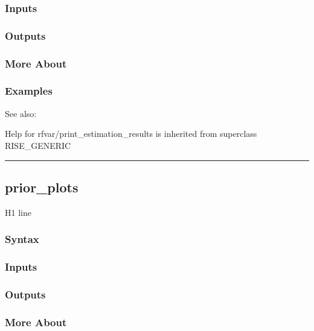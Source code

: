 \documentclass[letterpaper,10pt,english]{sphinxmanual}
\begin{document}
\subsubsection{Inputs}
\label{classes/models/@rfvar/rfvar:id90}

\subsubsection{Outputs}
\label{classes/models/@rfvar/rfvar:id91}

\subsubsection{More About}
\label{classes/models/@rfvar/rfvar:id92}

\subsubsection{Examples}
\label{classes/models/@rfvar/rfvar:id93}
See also:

Help for rfvar/print\_estimation\_results is inherited from superclass RISE\_GENERIC


\bigskip\hrule{}\bigskip



\subsection{prior\_plots}
\label{classes/models/@rfvar/rfvar:id94}\label{classes/models/@rfvar/rfvar:prior-plots}
H1 line


\subsubsection{Syntax}
\label{classes/models/@rfvar/rfvar:id95}

\subsubsection{Inputs}
\label{classes/models/@rfvar/rfvar:id96}

\subsubsection{Outputs}
\label{classes/models/@rfvar/rfvar:id97}

\subsubsection{More About}
\label{classes/models/@rfvar/rfvar:id98}
\end{document}
